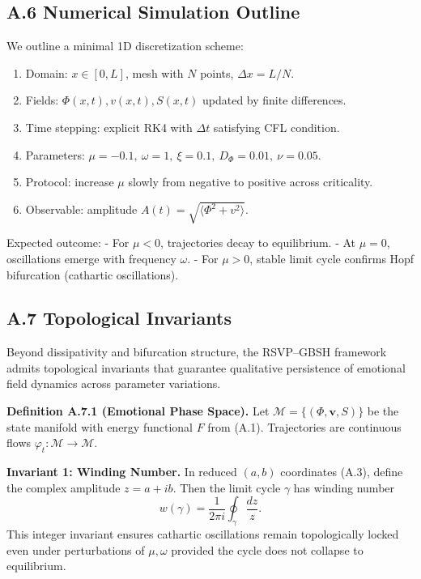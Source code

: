 \documentclass[11pt]{article}
\theoremstyle{plain}
\begin{document}
\subsection*{A.6 Numerical Simulation Outline}

We outline a minimal 1D discretization scheme:

\begin{enumerate}
\item Domain: $x\in [0,L]$, mesh with $N$ points, $\Delta x = L/N$.
\item Fields: $\Phi(x,t), v(x,t), S(x,t)$ updated by finite differences.
\item Time stepping: explicit RK4 with $\Delta t$ satisfying CFL condition.
\item Parameters: $\mu=-0.1,\ \omega=1,\ \xi=0.1,\ D_\Phi=0.01,\ \nu=0.05$.
\item Protocol: increase $\mu$ slowly from negative to positive across criticality.
\item Observable: amplitude $A(t)=\sqrt{\langle \Phi^2+v^2\rangle}$.
\end{enumerate}

Expected outcome:  
- For $\mu<0$, trajectories decay to equilibrium.  
- At $\mu=0$, oscillations emerge with frequency $\omega$.  
- For $\mu>0$, stable limit cycle confirms Hopf bifurcation (cathartic oscillations).

\subsection*{A.7 Topological Invariants}

Beyond dissipativity and bifurcation structure, the RSVP--GBSH framework admits
topological invariants that guarantee qualitative persistence of emotional
field dynamics across parameter variations.  

\textbf{Definition A.7.1 (Emotional Phase Space).}  
Let $\mathcal{M} = \{ (\Phi,\mathbf{v},S) \}$ be the state manifold with energy
functional $F$ from (A.1). Trajectories are continuous flows $\varphi_t :
\mathcal{M}\to \mathcal{M}$.  

\textbf{Invariant 1: Winding Number.}  
In reduced $(a,b)$ coordinates (A.3), define the complex amplitude
$z=a+ib$. Then the limit cycle $\gamma$ has winding number
\[
w(\gamma) = \frac{1}{2\pi i}\oint_\gamma \frac{dz}{z}.
\]
This integer invariant ensures cathartic oscillations remain topologically
locked even under perturbations of $\mu,\omega$ provided the cycle does not
collapse to equilibrium.
\end{document}
